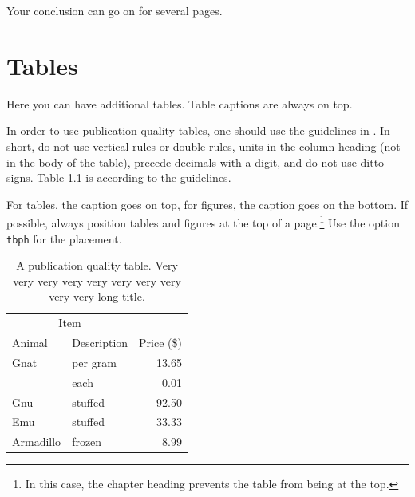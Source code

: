 \documentclass[msc,oneside]{ubcthesis}%
\begin{document}
\newpage
Your conclusion can go on for several pages.


%


\newpage %
\pagestyle{fancy}\rhead{}\cfoot{}\rfoot{\thepage}


%

\newpage
\pagestyle{headings}

\appendix 
\addappheadtotoc %
\appendixpage 



\chapter{Tables}
Here you can have additional tables. Table captions are always on top.

In order to use publication quality tables, one should use the guidelines in . In short, do not use vertical rules or double rules, units in the column heading (not in the body of the table), precede decimals with a digit, and do not use ditto signs. Table \ref{table:food} is according to the guidelines. 

For tables, the caption goes on top, for figures, the caption goes on the bottom. If possible, always position tables and figures at the top of a page.\footnote{In this case, the chapter heading prevents the table from being at the top.} Use the option \verb|tbph| for the placement.

\begin{table}[tbph]
\centering
\caption{A publication quality table. Very very very very very very very very very very long title.
\label{table:food}}
\begin{tabular}{@{}llr@{}} \toprule 
\multicolumn{2}{c}{Item} \\ \cmidrule(r){1-2} 
Animal & Description & Price (\$)\\ \midrule 
Gnat & per gram & 13.65 \\ 
& each & 0.01 \\ 
Gnu & stuffed & 92.50 \\ 
Emu & stuffed & 33.33 \\ 
Armadillo & frozen & 8.99 \\ \bottomrule 
\end{tabular}
\end{table}
\end{document}
